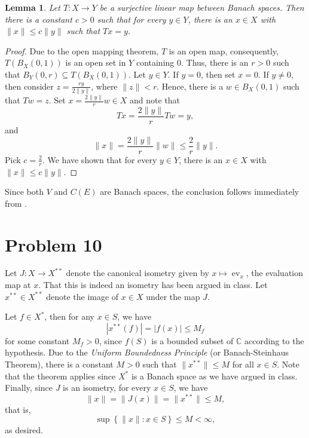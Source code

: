 \documentclass[10pt]{amsart}
\theoremstyle{thmstyle}
\newtheorem{lemma}[theorem]{Lemma}
\theoremstyle{defstyle}
\newcommand{\bbC}{\mathbb{C}}
\newcommand{\ev}{\operatorname{ev}}
\renewcommand{\le}{\leqslant}
\begin{document}
\begin{lemma}
	Let $T: X\to Y$ be a surjective linear map between Banach spaces. Then there is a constant $c > 0$ such that for every $y\in Y$, there is an $x\in X$ with $\|x\|\le c\|y\|$ such that $Tx = y$.
\end{lemma}
\begin{proof}
	Due to the open mapping theorem, $T$ is an open map, consequently, $T\left(B_X(0, 1)\right)$ is an open set in $Y$ containing $0$. Thus, there is an $r > 0$ such that $B_Y(0, r)\subseteq T\left(B_X(0, 1)\right)$. Let $y\in Y$. If $y = 0$, then set $x = 0$. If $y\ne 0$, then consider $z = \frac{ry}{2\|y\|}$, where $\|z\| < r$. Hence, there is a $w\in B_X(0, 1)$ such that $Tw = z$. Set $x = \frac{2\|y\|}{r}w\in X$ and note that 
	\begin{equation*}
		Tx = \frac{2\|y\|}{r}Tw = y,
	\end{equation*}
	and 
	\begin{equation*}
		\|x\| = \frac{2\|y\|}{r}\|w\|\le \frac{2}{r}\|y\|.
	\end{equation*}
	Pick $c = \frac{2}{r}$. We have shown that for every $y\in Y$, there is an $x\in X$ with $\|x\|\le c\|y\|$.
\end{proof}

Since both $V$ and $C(E)$ are Banach spaces, the conclusion follows immediately from .

\section{Problem 10}
Let $J: X\to X^{\ast\ast}$ denote the canonical isometry given by $x\mapsto\ev_x$, the evaluation map at $x$. That this is indeed an isometry has been argued in class. Let $x^{\ast\ast}\in X^{\ast\ast}$ denote the image of $x\in X$ under the map $J$. 

Let $f\in X^\ast$, then for any $x\in S$, we have 
\begin{equation*}
	|x^{\ast\ast}(f)| = |f(x)|\le M_f
\end{equation*}
for some constant $M_f > 0$, since $f(S)$ is a bounded subset of $\bbC$ according to the hypothesis. Due to the \emph{Uniform Boundedness Principle} (or Banach-Steinhaus Theorem), there is a constant $M > 0$ such that $\|x^{\ast\ast}\|\le M$ for all $x\in S$. Note that the theorem applies since $X^\ast$ is a Banach space as we have argued in class. Finally, since $J$ is an isometry, for every $x\in S$, we have 
\begin{equation*}
	\|x\| = \|J(x)\| = \|x^{\ast\ast}\|\le M,
\end{equation*}
that is, 
\begin{equation*}
	\sup\left\{\|x\|\colon x\in S\right\}\le M < \infty,
\end{equation*}
as desired.
\end{document}
